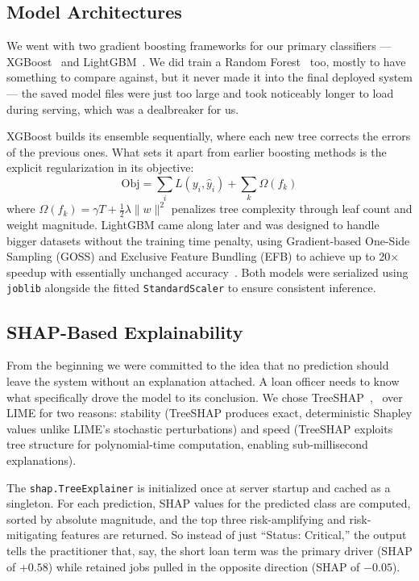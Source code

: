 \documentclass[conference]{IEEEtran}
\begin{document}
\subsection{Model Architectures}

We went with two gradient boosting frameworks for our primary classifiers --- XGBoost~\cite{10} and LightGBM~\cite{11}. We did train a Random Forest~\cite{9} too, mostly to have something to compare against, but it never made it into the final deployed system --- the saved model files were just too large and took noticeably longer to load during serving, which was a dealbreaker for us.

XGBoost builds its ensemble sequentially, where each new tree corrects the errors of the previous ones. What sets it apart from earlier boosting methods is the explicit regularization in its objective:
\begin{equation}
\text{Obj} = \sum_{i} L(y_i, \hat{y}_i) + \sum_{k} \Omega(f_k)
\end{equation}
where $\Omega(f_k) = \gamma T + \tfrac{1}{2}\lambda \|w\|^2$ penalizes tree complexity through leaf count and weight magnitude. LightGBM came along later and was designed to handle bigger datasets without the training time penalty, using Gradient-based One-Side Sampling (GOSS) and Exclusive Feature Bundling (EFB) to achieve up to 20$\times$ speedup with essentially unchanged accuracy~\cite{11}. Both models were serialized using \texttt{joblib} alongside the fitted \texttt{StandardScaler} to ensure consistent inference.

\subsection{SHAP-Based Explainability}

From the beginning we were committed to the idea that no prediction should leave the system without an explanation attached. A loan officer needs to know what specifically drove the model to its conclusion. We chose TreeSHAP~\cite{17},~\cite{18} over LIME for two reasons: stability (TreeSHAP produces exact, deterministic Shapley values unlike LIME's stochastic perturbations) and speed (TreeSHAP exploits tree structure for polynomial-time computation, enabling sub-millisecond explanations).

The \texttt{shap.TreeExplainer} is initialized once at server startup and cached as a singleton. For each prediction, SHAP values for the predicted class are computed, sorted by absolute magnitude, and the top three risk-amplifying and risk-mitigating features are returned. So instead of just ``Status: Critical,'' the output tells the practitioner that, say, the short loan term was the primary driver (SHAP of $+0.58$) while retained jobs pulled in the opposite direction (SHAP of $-0.05$).
\end{document}
